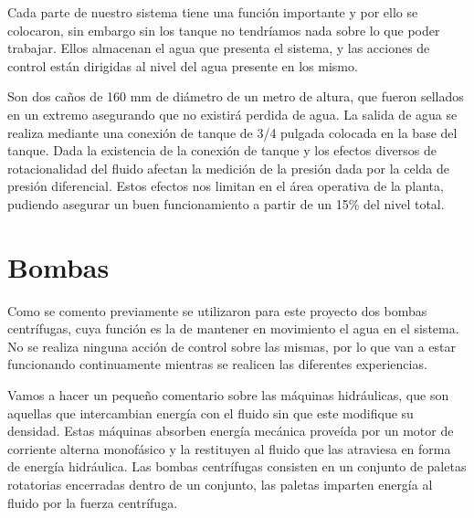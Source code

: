 Cada parte de nuestro sistema tiene una función importante y por ello se colocaron, sin embargo sin los
tanque no tendríamos nada sobre lo que poder trabajar. Ellos almacenan el agua que presenta el sistema,
y las acciones de control están dirigidas al nivel del agua presente en los mismo.

Son dos caños de 160 mm de diámetro de un metro de altura, que fueron sellados en un extremo asegurando
que no existirá perdida de agua.
La salida de agua se realiza mediante una conexión de tanque de 3/4 pulgada colocada en la base del 
tanque.
Dada la existencia de la conexión de tanque y los efectos diversos de rotacionalidad del fluido afectan
la medición de la presión dada por la celda de presión diferencial. Estos efectos nos limitan en el 
área operativa de la planta, pudiendo asegurar un buen funcionamiento a partir de un 15\% del nivel 
total. 
\section{Bombas}
\label{sec:Bombas}
Como se comento previamente se utilizaron para este proyecto dos bombas centrífugas, cuya función es
la de mantener en movimiento el agua en el sistema. No se realiza ninguna acción de control sobre las
mismas, por lo que van a estar funcionando continuamente mientras se realicen las diferentes 
experiencias. 

Vamos a hacer un pequeño comentario sobre las máquinas hidráulicas, que son aquellas que intercambian
energía con el fluido sin que este modifique su densidad. Estas máquinas absorben energía mecánica 
proveída por un motor de corriente alterna monofásico y la restituyen al fluido que las atraviesa en
forma de  energía hidráulica. Las bombas centrífugas consisten en un conjunto de paletas rotatorias 
encerradas dentro de un conjunto, las paletas imparten energía al fluido por la fuerza centrífuga.

